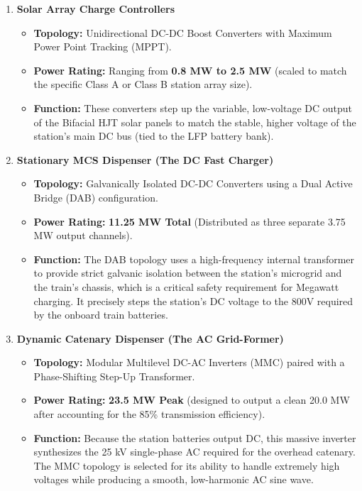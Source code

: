 \begin{enumerate}
    \item \textbf{Solar Array Charge Controllers}
    \begin{itemize}
        \item \textbf{Topology:} Unidirectional DC-DC Boost Converters with Maximum Power Point Tracking (MPPT).
        \item \textbf{Power Rating:} Ranging from \textbf{0.8 MW to 2.5 MW} (scaled to match the specific Class A or Class B station array size).
        \item \textbf{Function:} These converters step up the variable, low-voltage DC output of the Bifacial HJT solar panels to match the stable, higher voltage of the station's main DC bus (tied to the LFP battery bank).
    \end{itemize}

    \item \textbf{Stationary MCS Dispenser (The DC Fast Charger)}
    \begin{itemize}
        \item \textbf{Topology:} Galvanically Isolated DC-DC Converters using a Dual Active Bridge (DAB) configuration. 
        \item \textbf{Power Rating:} \textbf{11.25 MW Total} (Distributed as three separate 3.75 MW output channels).
        \item \textbf{Function:} The DAB topology uses a high-frequency internal transformer to provide strict galvanic isolation between the station's microgrid and the train's chassis, which is a critical safety requirement for Megawatt charging. It precisely steps the station's DC voltage to the 800V required by the onboard train batteries.
    \end{itemize}

    \item \textbf{Dynamic Catenary Dispenser (The AC Grid-Former)}
    \begin{itemize}
        \item \textbf{Topology:} Modular Multilevel DC-AC Inverters (MMC) paired with a Phase-Shifting Step-Up Transformer.
        \item \textbf{Power Rating:} \textbf{23.5 MW Peak} (designed to output a clean 20.0 MW after accounting for the 85\% transmission efficiency).
        \item \textbf{Function:} Because the station batteries output DC, this massive inverter synthesizes the 25 kV single-phase AC required for the overhead catenary. The MMC topology is selected for its ability to handle extremely high voltages while producing a smooth, low-harmonic AC sine wave.
    \end{itemize}
\end{enumerate}

